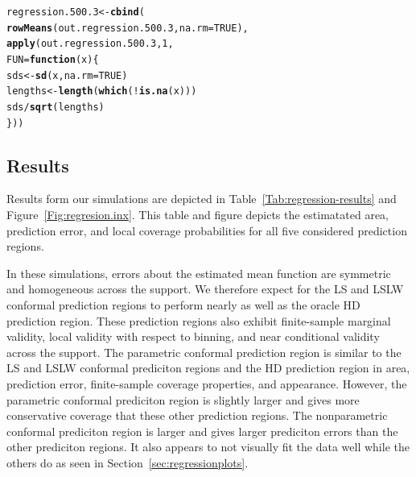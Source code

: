 \documentclass[11pt]{article}\usepackage[]{graphicx}\usepackage[]{color}
\makeatletter
\newcommand{\hlnum}[1]{\textcolor[rgb]{0.686,0.059,0.569}{#1}}%
\newcommand{\hlopt}[1]{\textcolor[rgb]{0,0,0}{#1}}%
\newcommand{\hlstd}[1]{\textcolor[rgb]{0.345,0.345,0.345}{#1}}%
\newcommand{\hlkwa}[1]{\textcolor[rgb]{0.161,0.373,0.58}{\textbf{#1}}}%
\newcommand{\hlkwb}[1]{\textcolor[rgb]{0.69,0.353,0.396}{#1}}%
\newcommand{\hlkwc}[1]{\textcolor[rgb]{0.333,0.667,0.333}{#1}}%
\newcommand{\hlkwd}[1]{\textcolor[rgb]{0.737,0.353,0.396}{\textbf{#1}}}%
\newenvironment{kframe}{%
 \def\at@end@of@kframe{}%
 \ifinner\ifhmode%
  \def\at@end@of@kframe{\end{minipage}}%
  \begin{minipage}{\columnwidth}%
 \fi\fi%
 \def\FrameCommand##1{\hskip\@totalleftmargin \hskip-\fboxsep
 \colorbox{shadecolor}{##1}\hskip-\fboxsep
     \hskip-\linewidth \hskip-\@totalleftmargin \hskip\columnwidth}%
 \MakeFramed {\advance\hsize-\width
   \@totalleftmargin\z@ \linewidth\hsize
   \@setminipage}}%
 {\par\unskip\endMakeFramed%
 \at@end@of@kframe}
\newenvironment{knitrout}{}{} %
\makeatother
\begin{document}
\begin{knitrout}
\color{fgcolor}\begin{kframe}
\begin{alltt}
\hlstd{regression.500.3} \hlkwb{<-} \hlkwd{cbind}\hlstd{(}
  \hlkwd{rowMeans}\hlstd{(out.regression.500.3,} \hlkwc{na.rm} \hlstd{=} \hlnum{TRUE}\hlstd{),}
  \hlkwd{apply}\hlstd{(out.regression.500.3,} \hlnum{1}\hlstd{,}
  \hlkwc{FUN} \hlstd{=} \hlkwa{function}\hlstd{(}\hlkwc{x}\hlstd{)\{}
    \hlstd{sds} \hlkwb{<-} \hlkwd{sd}\hlstd{(x,} \hlkwc{na.rm} \hlstd{=} \hlnum{TRUE}\hlstd{)}
    \hlstd{lengths} \hlkwb{<-} \hlkwd{length}\hlstd{(}\hlkwd{which}\hlstd{(}\hlopt{!}\hlkwd{is.na}\hlstd{(x)))}
    \hlstd{sds} \hlopt{/} \hlkwd{sqrt}\hlstd{(lengths)}
  \hlstd{\}))}
\end{alltt}
\end{kframe}
\end{knitrout}



\subsection{Results}

Results form our simulations are depicted in 
Table~\ref{Tab:regression-results} and Figure~\ref{Fig:regresion.inx}.  
This table and figure depicts the estimatated area, prediction 
error, and local coverage probabilities for all five considered prediction 
regions. 

In these simulations, errors about the estimated mean function are symmetric 
and homogeneous across the support.  We therefore expect for the LS and LSLW 
conformal prediction regions to perform nearly as well as the oracle HD 
prediction region.  These prediction regions also exhibit finite-sample 
marginal validity, local validity with respect to binning, and near 
conditional validity across the support.  The parametric conformal prediction 
region is similar to the LS and LSLW conformal prediciton regions and the HD 
prediction region in area, prediction error, finite-sample coverage 
properties, and appearance.  However, the parametric conformal prediciton 
region is slightly larger and gives more conservative coverage that these 
other prediction regions.  The nonparametric conformal prediciton region 
is larger and gives larger prediciton errors than the other prediciton 
regions.  It also appears to not visually fit the data well while the others 
do as seen in Section~\ref{sec:regressionplots}.
\end{document}
